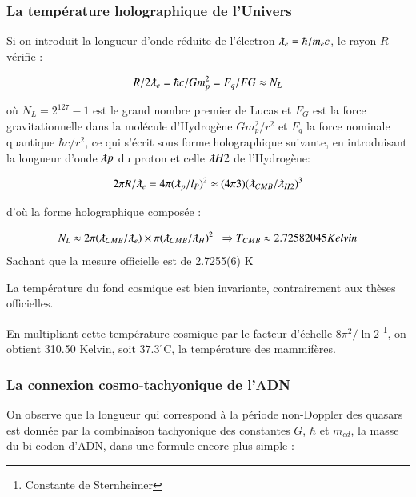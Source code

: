 \documentclass[a4paper,12pt]{article}
\begin{document}
\subsubsection{La température holographique de l'Univers }

     Si on introduit la longueur d'onde réduite de l'électron $\lambdabar_e =  \hbar/m_ec$, le rayon $R$ vérifie :

\begin{equation}
R/2\lambdabar_e = \hbar c/Gm_p^2 = F_q/FG \approx N_L
\end{equation}


où $N_L = 2^{127}-1$ est le grand nombre premier de Lucas et $F_G$ est la force gravitationnelle dans la molécule d'Hydrogène $Gm_p^2/r^2$ et $F_q$ la force nominale quantique $\hbar c/r^2$, ce qui s'écrit sous forme holographique suivante, en introduisant la longueur d'onde $\lambdabar p$ du proton et celle $\lambdabar H2$ de l'Hydrogène:

\begin{equation}
2\pi R/\lambdabar_e = 4\pi (\lambdabar_p /l_P)^2  \approx (4\pi 3) (\lambdabar_{CMB}/\lambdabar_{H2})^3
\end{equation}


d'où la forme holographique composée :

\begin{equation}
N_L \approx 2\pi (\lambdabar_{CMB}/\lambdabar_{e}) \times \pi (\lambdabar_{CMB}/\lambdabar_{H})^2   ~~  \Rightarrow T_{CMB}  \approx 2.72582045  Kelvin
\end{equation}    
Sachant que la mesure officielle est de 2.7255(6) K

La température du fond cosmique est bien invariante, contrairement aux thèses officielles.

En multipliant cette température cosmique par le facteur d'échelle $8 \pi^2/\ln{2}$ \footnote{Constante de Sternheimer}, on obtient 310.50 Kelvin, soit $37.3^{\circ}$C, la température des mammifères.


\subsubsection{La connexion cosmo-tachyonique de l'ADN} 

      On observe que la longueur qui correspond à la période non-Doppler des quasars est donnée par la combinaison tachyonique des constantes $G$,  $\hbar$ et $m_{cd}$, la masse du bi-codon d'ADN, dans une formule encore plus simple :
      
\end{document}
